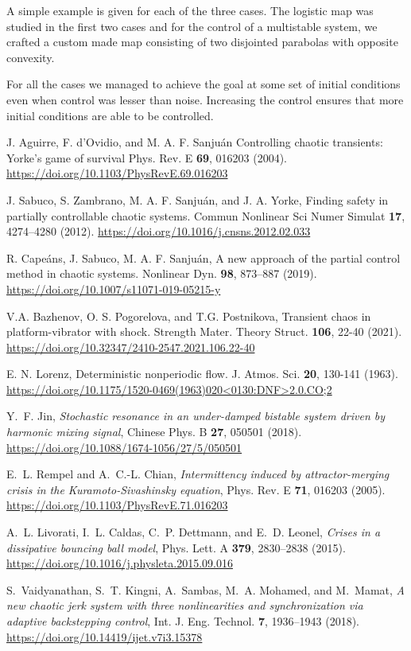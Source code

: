 A simple example is given for each of the three cases. The logistic map was studied in the first two cases and for the control of a multistable system, we crafted a custom made map consisting of two disjointed parabolas with opposite convexity.

For all the cases we managed to achieve the goal at some set of initial conditions even when control was lesser than noise. Increasing the control ensures that more initial conditions are able to be controlled.



\begin{thebibliography}{05}

J. Aguirre, F. d’Ovidio, and M. A. F. Sanjuán
Controlling chaotic transients: Yorke’s game of survival
Phys. Rev. E \textbf{69}, 016203 
(2004).
\url{https://doi.org/10.1103/PhysRevE.69.016203}

J. Sabuco, S. Zambrano, M. A. F. Sanjuán, and J. A. Yorke,
Finding safety in partially controllable chaotic systems.
Commun Nonlinear Sci Numer Simulat \textbf{17}, 4274–4280 
(2012).
\url{https://doi.org/10.1016/j.cnsns.2012.02.033}

R. Capeáns, J. Sabuco, M. A. F. Sanjuán,
A new approach of the partial control method in chaotic
systems.
Nonlinear Dyn. \textbf{98}, 873–887 
(2019). 
\url{https://doi.org/10.1007/s11071-019-05215-y}



V.A. Bazhenov, O. S. Pogorelova, and T.G. Postnikova,
Transient chaos in platform-vibrator with shock.
Strength Mater. Theory Struct. \textbf{106}, 22-40 
(2021).
\url{https://doi.org/10.32347/2410-2547.2021.106.22-40}

E. N. Lorenz,
Deterministic nonperiodic flow.
J. Atmos. Sci. \textbf{20}, 130-141 
(1963).
\url{https://doi.org/10.1175/1520-0469(1963)020<0130:DNF>2.0.CO;2}


Y.~F. Jin,
{\em Stochastic resonance in an under-damped bistable system driven by harmonic mixing signal}, 
Chinese Phys. B \textbf{27}, 050501 
(2018).
\url{https://doi.org/10.1088/1674-1056/27/5/050501}


E.~L. Rempel and A.~C.-L. Chian, 
{\em Intermittency induced by attractor-merging crisis in the Kuramoto-Sivashinsky equation}, 
Phys. Rev. E \textbf{71}, 016203 
(2005).
\url{https://doi.org/10.1103/PhysRevE.71.016203}

A.~L. Livorati, I.~L. Caldas, C.~P. Dettmann, and E.~D. Leonel,
{\em Crises in a dissipative bouncing ball model},
Phys. Lett. A \textbf{379}, 2830--2838 
(2015).
\url{https://doi.org/10.1016/j.physleta.2015.09.016}

S.~Vaidyanathan, S.~T. Kingni, A.~Sambas, M.~A. Mohamed, and M.~Mamat,
{\em A new chaotic jerk system with three nonlinearities and synchronization via adaptive backstepping control},
Int. J. Eng. Technol. \textbf{7}, 1936--1943 
(2018).
\url{https://doi.org/10.14419/ijet.v7i3.15378
}



\end{thebibliography}